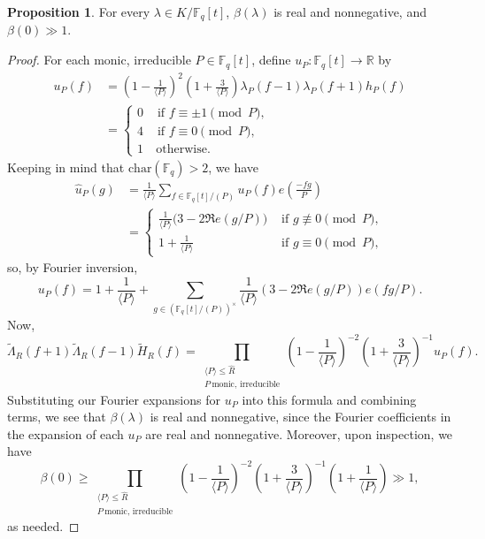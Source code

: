 \documentclass{article}
\theoremstyle{definition}
\newtheorem{prop}{Proposition}[section]
\theoremstyle{definition}
\theoremstyle{remark}
\newcommand{\R}{\mathbb{R}}
\newcommand{\F}{\mathbb{F}_q[t]}
\newcommand{\1}{\mathbf{1}}
\numberwithin{equation}{section}
\begin{document}
\begin{prop}\label{realandnonnegative}
For every $\lambda \in K\slash \F$, $\beta(\lambda)$ is real and nonnegative, and $\beta(0)\gg 1$. 
\end{prop}
\begin{proof}
For each monic, irreducible $P\in \F$, define $u_P:\F\to \R$ by 
\begin{align*}
u_P(f)&=\left(1-\frac{1}{ \langle P \rangle}\right)^2\left(1+\frac{3}{\langle P \rangle}\right)\lambda_P(f-1)\lambda_P(f+1)h_P(f)\\
&=
\begin{cases}
0 &\text{ if } f\equiv \pm 1\pmod{P},\\
4 &\text{ if } f\equiv 0\pmod{P},\\
1 &~\text{otherwise}.
\end{cases}
\end{align*}
Keeping in mind that $\text{char}(\mathbb{F}_q)>2$, we have
\begin{align*}
\widehat{u}_P(g)&=\frac{1}{\langle P \rangle}\sum_{f\in \F\slash (P)}u_P(f)e\left(\frac{-fg}{P}\right)\\
&=
\begin{cases}
\frac{1}{\langle P \rangle}\big(3-2\Re e(g\slash P)\big) &\text{ if } g\not\equiv 0\pmod{P},\\
1+\frac{1}{\langle P \rangle}&\text{ if } g\equiv 0\pmod{P},
\end{cases}
\end{align*}
so, by Fourier inversion, 
\[u_P(f)=1+\frac{1}{\langle P \rangle}+\sum_{g\in (\F\slash (P))^\times}\frac{1}{\langle P \rangle}\left(3-2\Re e(g\slash P)\right)e(fg\slash P).\]
Now, 
\[\tilde{\Lambda}_R(f+1)\tilde{\Lambda}_R(f-1)\tilde{H}_R(f)=\prod_{\substack{\langle P \rangle \leq \widehat{R}\\ P~\text{monic, irreducible}}}\left(1-\frac{1}{ \langle P \rangle}\right)^{-2}\left(1+\frac{3}{\langle P \rangle}\right)^{-1}u_P(f).\]
Substituting our Fourier expansions for $u_P$ into this formula and combining terms, we see that $\beta(\lambda)$ is real and nonnegative, since the Fourier coefficients in the expansion of each $u_P$ are real and nonnegative. Moreover, upon inspection, we have 
\[\beta(0)\geq \prod_{\substack{\langle P \rangle \leq \widehat{R}\\ P~\text{monic, irreducible}}}\left(1-\frac{1}{ \langle P \rangle}\right)^{-2}\left(1+\frac{3}{\langle P \rangle}\right)^{-1}\left(1+\frac{1}{\langle P \rangle }\right)\gg1,\]
as needed.
\end{proof}
\end{document}
